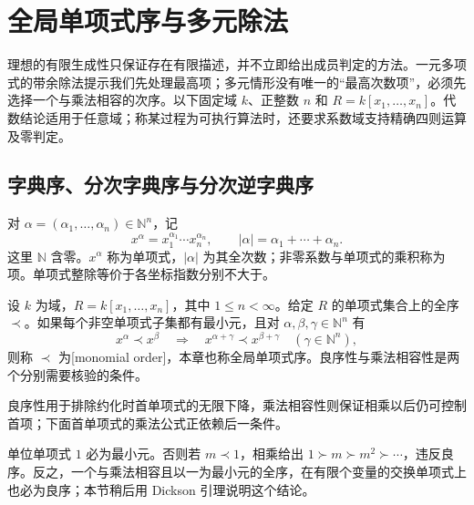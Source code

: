 
\section{全局单项式序与多元除法}
\label{b3:sec:0801}

理想的有限生成性只保证存在有限描述，并不立即给出成员判定的方法。一元多项式的带余除法提示我们先处理最高项；多元情形没有唯一的“最高次数项”，必须先选择一个与乘法相容的次序。以下固定域 \(k\)、正整数 \(n\) 和 \(R=k[x_1,\ldots,x_n]\)。代数结论适用于任意域；称某过程为可执行算法时，还要求系数域支持精确四则运算及零判定。
\subsection{字典序、分次字典序与分次逆字典序}
\label{b3:subsec:0801:01}

对 \(\alpha=(\alpha_1,\ldots,\alpha_n)\in\mathbb N^n\)，记
\[
	x^\alpha=x_1^{\alpha_1}\cdots x_n^{\alpha_n}, \qquad |\alpha|=\alpha_1+\cdots+\alpha_n.
\]
这里 \(\mathbb N\) 含零。\(x^\alpha\) 称为单项式，\(|\alpha|\) 为其全次数；非零系数与单项式的乘积称为项。单项式整除等价于各坐标指数分别不大于。

\begin{definition}\label{b3:def:global-monomial-order}
	设 \(k\) 为域，\(R=k[x_1,\ldots,x_n]\)，其中 \(1\le n<\infty\)。给定 \(R\) 的单项式集合上的全序 \(\prec\)。如果每个非空单项式子集都有最小元，且对 \(\alpha,\beta,\gamma\in\mathbb N^n\) 有
	\[
		x^\alpha\prec x^\beta \quad\Longrightarrow\quad x^{\alpha+\gamma}\prec x^{\beta+\gamma} \quad(\gamma\in\mathbb N^n),
	\]
	则称 \(\prec\) 为[monomial order]，本章也称全局单项式序。良序性与乘法相容性是两个分别需要核验的条件。
\end{definition}

良序性用于排除约化时首单项式的无限下降，乘法相容性则保证相乘以后仍可控制首项；下面首单项式的乘法公式正依赖后一条件。

单位单项式 \(1\) 必为最小元。否则若 \(m\prec1\)，相乘给出 \(1\succ m\succ m^2\succ\cdots\)，违反良序。反之，一个与乘法相容且以一为最小元的全序，在有限个变量的交换单项式上也必为良序；本节稍后用 Dickson 引理说明这个结论。

